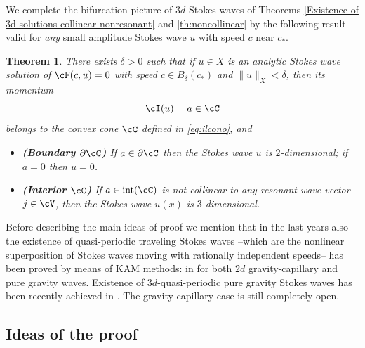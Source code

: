 \documentclass[11pt,a4paper,reqno]{article}
\DeclareMathOperator{\interior}{int}
\numberwithin{equation}{section}
\newtheorem{theorem}{Theorem}[section]
\theoremstyle{definition}
\begin{document}
\smallskip

We complete the bifurcation picture 
of $ 3d$-Stokes waves of 
Theorems \ref{Existence of 3d solutions collinear nonresonant} and 
\ref{th:noncollinear} 
by the 
following 
result  valid for {\it any} small amplitude 
Stokes wave   $ u$ 
with  speed  $ c $ 
near $ c_* $.  

\begin{theorem} \label{th:(u,c) and cI}
    There exists $ \delta > 0 $ 
    such that if $ u \in X $ is an analytic 
    Stokes wave solution 
    of $ \cF (c,u) = 0 $ 
    with speed 
 $ c\in B_\delta(c_*)$ and 
    $\| u\|_{X}<\delta$,  
then its
momentum  
\begin{equation}\label{Identroa}
\cI(u)=a \in \cC  
\end{equation}
belongs 
to the convex cone $ \cC $ defined in \eqref{eq:ilcono},  and 
    \begin{itemize}
        \item[$(\mathfrak{B})$]
        {\bf (Boundary $ \partial \cC $)} 
        If $a\in \partial\cC$ then the Stokes wave $u $ is $2$-dimensional; 
        if $ a = 0 $ then $ u = 0 $.
        \item[$(\mathfrak{I})$]
        {\bf (Interior  $ \cC $)} 
        If $a\in \interior(\cC)$
        is not collinear to any  resonant wave vector $j\in \cV$,  then the Stokes wave $u (x) $ is $3$-dimensional.
    \end{itemize}
\end{theorem}



Before describing the main ideas of proof we mention that in the last years also the existence of quasi-periodic  traveling Stokes waves --which are the nonlinear superposition of Stokes waves moving with rationally independent speeds--
 has been proved  by means of KAM methods: in \cite{BFM,FG,BFM2} for 
 both $ 2 d $ gravity-capillary and pure gravity waves. 
Existence of $ 3 d $-quasi-periodic 
pure gravity Stokes waves  has been 
recently achieved in \cite{FMT}. The gravity-capillary case is still  completely open. 

\subsection{Ideas of the proof}
\label{sec:ideas}
\end{document}
